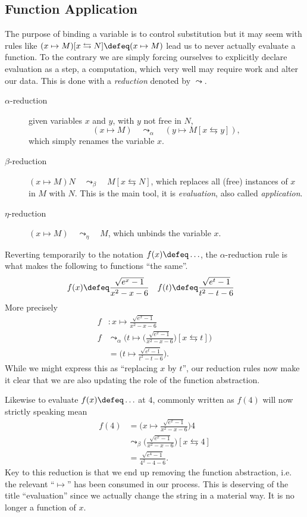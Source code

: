 \subsection{Function Application}
The purpose of binding a variable is to control substitution but it may seem 
with rules like $(x\mapsto M)[x\leftrightarrows N]\defeq (x\mapsto M)$ lead 
us to never actually evaluate a function.  To the contrary we are simply forcing 
ourselves to explicitly declare evaluation as a step, a computation, which 
very well may require work and alter our data.  This is done with a \emph{reduction}
denoted by $\leadsto$.
\begin{description}
    \item[$\alpha$-reduction] given variables $x$ and $y$, with $y$ not free in $N$,
    \[(x\mapsto M)\quad \leadsto_{\alpha}\quad (y\mapsto M[x\leftrightarrows y]),\]
    which simply renames the variable $x$.

    \item[$\beta$-reduction]
    $(x\mapsto M)N \quad \leadsto_{\beta} \quad M[x\leftrightarrows N]$, which replaces all (free)
    instances of $x$ in $M$ with $N$.  This is the main tool, it is \emph{evaluation},
    also called \emph{application}.
    
    \item[$\eta$-reduction]
    $(x\mapsto M)\quad \leadsto_{\eta} \quad M$, which unbinds the variable $x$.
\end{description}

Reverting temporarily to the notation $f(x)\defeq \ldots$, the $\alpha$-reduction rule
is what makes the following to functions ``the same''.
\begin{align*}
    f(x) &\defeq  \frac{\sqrt{e^x-1}}{x^2-x-6}
    & 
    f(t) &\defeq  \frac{\sqrt{e^t-1}}{t^2-t-6}
\end{align*}
More precisely
\begin{align*}
    f&:x\mapsto \frac{\sqrt{e^x-1}}{x^2-x-6}\\
    f & \leadsto_{\alpha} \biggl(t\mapsto \biggl(\frac{\sqrt{e^x-1}}{x^2-x-6}\biggr)[x\leftrightarrows t]\biggr)\\
      &  = \biggl(t\mapsto\frac{\sqrt{e^t-1}}{t^2-t-6}\biggr).
\end{align*}
While we might express this as ``replacing $x$ by $t$'', our reduction rules
now make it clear that we are also updating the role of the function abstraction.


Likewise to evaluate $f(x)\defeq \ldots$ at $4$, commonly written as $f(4)$ will 
now strictly speaking mean
\begin{align*}
    f(4) & = \biggl(x\mapsto \frac{\sqrt{e^x-1}}{x^2-x-6}\biggr)4 \\
     & \leadsto_{\beta} \biggl(\frac{\sqrt{e^x-1}}{x^2-x-6}\biggr)[x\leftrightarrows 4]\\
    & =\frac{\sqrt{e^4-1}}{4^2-4-6}.
\end{align*}
Key to this reduction is that we end up removing the function abstraction, 
i.e. the relevant ``$\mapsto$'' has been consumed in our process.  This 
is deserving of the title ``evaluation'' since we actually change the string 
in a material way.  It is no longer a function of $x$.

